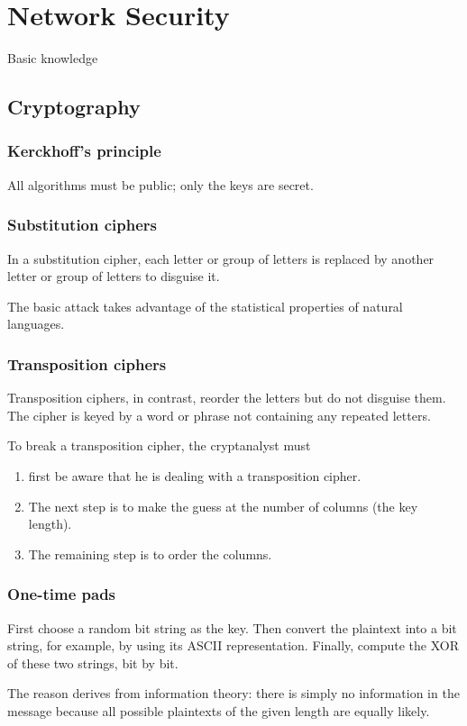 \newpage
\section{Network Security}
Basic knowledge
\subsection{Cryptography}
\subsubsection{Kerckhoff's principle}
All algorithms must be public; only the keys are secret.

\subsubsection{Substitution ciphers}
In a substitution cipher, each letter or group of letters is replaced by another letter or group of letters to disguise it.

The basic attack takes advantage of the statistical properties of natural languages.

\subsubsection{Transposition ciphers}
Transposition ciphers, in contrast, reorder the letters but do not disguise them. The cipher is keyed by a word or phrase not containing any repeated letters.

To break a transposition cipher, the cryptanalyst must 
\begin{enumerate}
    \item first be aware that he is dealing with a transposition cipher.
    \item The next step is to make the guess at the number of columns (the key length).
    \item The remaining step is to order the columns.
\end{enumerate}


\subsubsection{One-time pads}
First choose a random bit string as the key. Then convert the plaintext
into a bit string, for example, by using its ASCII representation.
Finally, compute the XOR of these two strings, bit by bit.

The reason derives from information theory: there is simply no
information in the message because all possible plaintexts of the given
length are equally likely.

